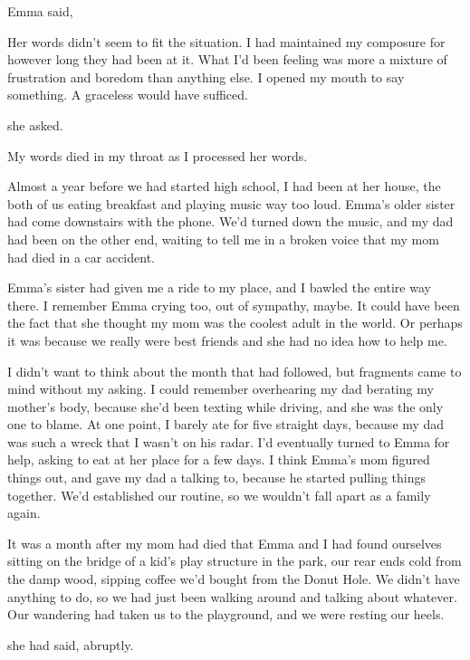  Emma said, 

Her words didn't seem to fit the situation. I had maintained my composure for however long they had been at it. What I'd been feeling was more a mixture of frustration and boredom than anything else. I opened my mouth to say something. A graceless  would have sufficed.

 she asked.

My words died in my throat as I processed her words.

Almost a year before we had started high school, I had been at her house, the both of us eating breakfast and playing music way too loud. Emma's older sister had come downstairs with the phone. We'd turned down the music, and my dad had been on the other end, waiting to tell me in a broken voice that my mom had died in a car accident.

Emma's sister had given me a ride to my place, and I bawled the entire way there. I remember Emma crying too, out of sympathy, maybe. It could have been the fact that she thought my mom was the coolest adult in the world. Or perhaps it was because we really were best friends and she had no idea how to help me.

I didn't want to think about the month that had followed, but fragments came to mind without my asking. I could remember overhearing my dad berating my mother's body, because she'd been texting while driving, and she was the only one to blame. At one point, I barely ate for five straight days, because my dad was such a wreck that I wasn't on his radar. I'd eventually turned to Emma for help, asking to eat at her place for a few days. I think Emma's mom figured things out, and gave my dad a talking to, because he started pulling things together. We'd established our routine, so we wouldn't fall apart as a family again.

It was a month after my mom had died that Emma and I had found ourselves sitting on the bridge of a kid's play structure in the park, our rear ends cold from the damp wood, sipping coffee we'd bought from the Donut Hole. We didn't have anything to do, so we had just been walking around and talking about whatever. Our wandering had taken us to the playground, and we were resting our heels.

 she had said, abruptly.

